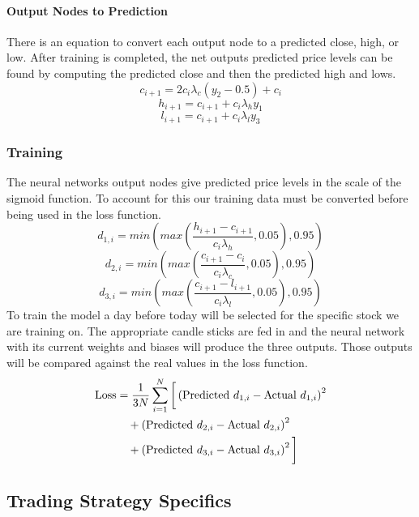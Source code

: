 \documentclass{article}
\begin{document}
\paragraph{Output Nodes to Prediction}
There is an equation to convert each output node to a predicted close, high, or low. After training is completed, the net outputs predicted price levels can be found by computing the predicted close and then the predicted high and lows.
$$c_{i+1}=2c_i\lambda_c(y_2-0.5)+c_i$$
$$h_{i+1} = c_{i+1}+c_i\lambda_hy_1$$
$$l_{i+1} = c_{i+1}+c_i\lambda_ly_3$$

\subsubsection{Training}
The neural networks output nodes give predicted price levels in the scale of the sigmoid function. To account for this our training data must be converted before being used in the loss function.
$$d_{1,i} = min(max(\frac{h_{i+1}-c_{i+1}}{c_i\lambda_h}, 0.05), 0.95)$$ $$d_{2,i} = min(max(\frac{c_{i+1}-c_{i}}{c_i\lambda_c}, 0.05), 0.95)$$ $$d_{3,i} = min(max(\frac{c_{i+1}-l_{i+1}}{c_i\lambda_l}, 0.05), 0.95)$$
To train the model a day before today will be selected for the specific stock we are training on. The appropriate candle sticks are fed in and the neural network with its current weights and biases will produce the three outputs. Those outputs will be compared against the real values in the loss function.
\begin{align}
    \text{Loss} &= \frac{1}{3N} \sum_{i=1}^N \bigg[ \left( \text{Predicted } d_{1,i} - \text{Actual } d_{1,i} \right)^2 \notag \\
    &\quad + \left( \text{Predicted } d_{2,i} - \text{Actual } d_{2,i} \right)^2 \notag \\
    &\quad + \left( \text{Predicted } d_{3,i} - \text{Actual } d_{3,i} \right)^2 \bigg]
    \label{loss_function}
\end{align}




\subsection{Trading Strategy Specifics}
\end{document}
